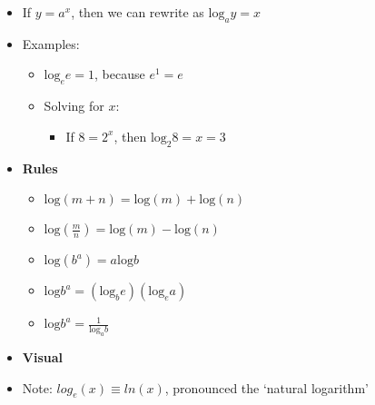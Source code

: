 \begin{itemize}
    \item If $y = a^x$, then we can rewrite as $\text{log}_a y = x$
    \item Examples: 
    \begin{itemize}
        \item $\text{log}_e e = 1$, because $e^1 = e$ 
        \item Solving for $x$: 
        \begin{itemize}
            \item If $8 = 2^x$, then $\text{log}_2 8 = x = 3$
        \end{itemize}
    \end{itemize}
    \item \textbf{Rules}
    \begin{itemize}
        \item $\text{log}(m + n) = \text{log}(m) + \text{log}(n)$ 
        \item $\text{log}(\frac{m}{n}) = \text{log}(m) - \text{log}(n)$
        \item $\text{log}(b^a) = a \text{log} b$
        \item $\text{log}b^a = (\text{log}_be)(\text{log}_ea)$ 
        \item $\text{log}b^a = \frac{1}{\text{log}_ab}$
    \end{itemize}
    \item \textbf{Visual}
    
    \resizebox{4in}{!}{
        
    }
    \item Note: $log_e(x) \equiv ln(x)$, pronounced the `natural logarithm' 
\end{itemize}